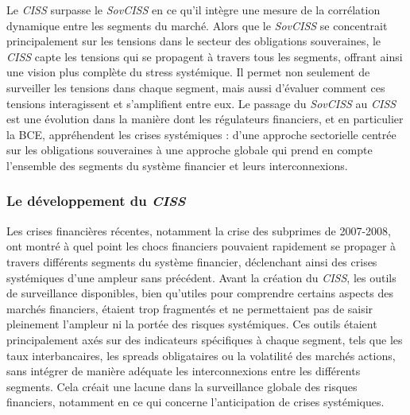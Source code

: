 Le \textit{CISS} surpasse le \textit{SovCISS} en ce qu’il intègre une mesure de la corrélation dynamique entre les segments du marché. Alors que le \textit{SovCISS} se concentrait principalement sur les tensions dans le secteur des obligations souveraines, le \textit{CISS} capte les tensions qui se propagent à travers tous les segments, offrant ainsi une vision plus complète du stress systémique. Il permet non seulement de surveiller les tensions dans chaque segment, mais aussi d’évaluer comment ces tensions interagissent et s’amplifient entre eux. Le passage du \textit{SovCISS} au \textit{CISS} est une évolution dans la manière dont les régulateurs financiers, et en particulier la BCE, appréhendent les crises systémiques : d’une approche sectorielle centrée sur les obligations souveraines à une approche globale qui prend en compte l'ensemble des segments du système financier et leurs interconnexions.

\subsubsection{Le développement du \textit{CISS}}

Les crises financières récentes, notamment la crise des subprimes de 2007-2008, ont montré à quel point les chocs financiers pouvaient rapidement se propager à travers différents segments du système financier, déclenchant ainsi des crises systémiques d’une ampleur sans précédent. Avant la création du \textit{CISS}, les outils de surveillance disponibles, bien qu'utiles pour comprendre certains aspects des marchés financiers, étaient trop fragmentés et ne permettaient pas de saisir pleinement l'ampleur ni la portée des risques systémiques. Ces outils étaient principalement axés sur des indicateurs spécifiques à chaque segment, tels que les taux interbancaires, les spreads obligataires ou la volatilité des marchés actions, sans intégrer de manière adéquate les interconnexions entre les différents segments. Cela créait une lacune dans la surveillance globale des risques financiers, notamment en ce qui concerne l’anticipation de crises systémiques.\\

